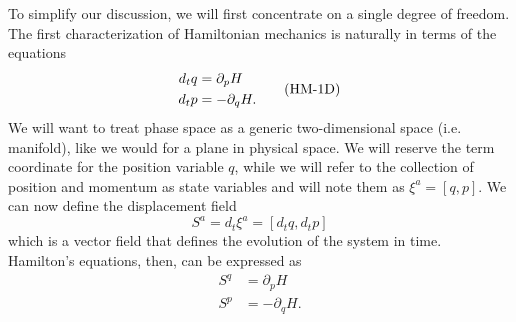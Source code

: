 To simplify our discussion, we will first concentrate on a single degree of freedom. The first characterization of Hamiltonian mechanics is naturally in terms of the equations
\begin{equation}\notag
	\begin{aligned}
		d_t q &= \partial_p H \\
		d_t p &= - \partial_q H.
	\end{aligned}
	\tag{HM-1D}\label{rp-cm-hm-condEquations}
\end{equation}
We will want to treat phase space as a generic two-dimensional space (i.e. manifold), like we would for a plane in physical space. We will reserve the term coordinate for the position variable $q$, while we will refer to the collection of position and momentum as state variables and will note them as $\xi^a = [q, p]$. We can now define the displacement field
\begin{equation}\label{rp-cm-displacement1d}
	S^a = d_t \xi^a = [d_t q, d_t p]
\end{equation}
which is a vector field that defines the evolution of the system in time. Hamilton's equations, then, can be expressed as
\begin{equation}\label{rp-cm-displacementCurl}
	\begin{aligned}
		S^q &= \partial_p H \\
		S^p &= - \partial_q H.
	\end{aligned}
\end{equation}

